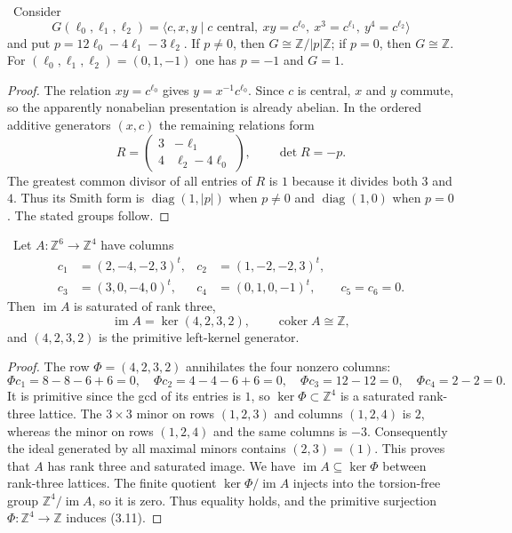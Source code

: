 \begin{proposition}
\label{prop:terminal-group}
\Verified\ Consider
\[
G(\ell_0,\ell_1,\ell_2)=
\langle c,x,y\mid c\text{ central},\
xy=c^{\ell_0},\ x^3=c^{\ell_1},\ y^4=c^{\ell_2}\rangle
\]
and put $p=12\ell_0-4\ell_1-3\ell_2$.  If $p\ne0$, then
$G\cong\mathbb Z/|p|\mathbb Z$; if $p=0$, then $G\cong\mathbb Z$.
For $(\ell_0,\ell_1,\ell_2)=(0,1,-1)$ one has $p=-1$ and $G=1$.
\end{proposition}

\begin{proof}
The relation $xy=c^{\ell_0}$ gives $y=x^{-1}c^{\ell_0}$.  Since $c$ is
central, $x$ and $y$ commute, so the apparently nonabelian presentation is
already abelian.  In the ordered additive generators $(x,c)$ the remaining
relations form
\[
R=\begin{pmatrix}3&-\ell_1\\4&\ell_2-4\ell_0\end{pmatrix},
\qquad \det R=-p.
\]
The greatest common divisor of all entries of $R$ is $1$ because it divides
both $3$ and $4$.  Thus its Smith form is
$\operatorname{diag}(1,|p|)$ when $p\ne0$ and
$\operatorname{diag}(1,0)$ when $p=0$.  The stated groups follow.
\end{proof}

\begin{proposition}
\label{prop:terminal-degree-two}
\Verified\ Let $A:\mathbb Z^6\to\mathbb Z^4$ have columns
\[
\begin{aligned}
c_1&=(2,-4,-2,3)^t,&c_2&=(1,-2,-2,3)^t,\\
c_3&=(3,0,-4,0)^t,&c_4&=(0,1,0,-1)^t,
\qquad c_5=c_6=0.
\end{aligned}
\]
Then $\operatorname{im}A$ is saturated of rank three,
\[
\operatorname{im}A=\ker(4,2,3,2),
\qquad
\operatorname{coker}A\cong\mathbb Z,
\tag{3.11}
\]
and $(4,2,3,2)$ is the primitive left-kernel generator.
\end{proposition}

\begin{proof}
The row $\Phi=(4,2,3,2)$ annihilates the four nonzero columns:
\[
\Phi c_1=8-8-6+6=0,\quad
\Phi c_2=4-4-6+6=0,\quad
\Phi c_3=12-12=0,\quad
\Phi c_4=2-2=0.
\]
It is primitive since the gcd of its entries is $1$, so
$\ker\Phi\subset\mathbb Z^4$ is a saturated rank-three lattice.
The $3\times3$ minor on rows $(1,2,3)$ and columns $(1,2,4)$ is $2$,
whereas the minor on rows $(1,2,4)$ and the same columns is $-3$.
Consequently the ideal generated by all maximal minors contains $(2,3)=(1)$.
This proves that $A$ has rank three and saturated image.  We have
$\operatorname{im}A\subseteq\ker\Phi$ between rank-three lattices.
The finite quotient $\ker\Phi/\operatorname{im}A$ injects into the
torsion-free group $\mathbb Z^4/\operatorname{im}A$, so it is zero.
Thus equality holds, and the primitive surjection $\Phi:\mathbb Z^4\to
\mathbb Z$ induces (3.11).
\end{proof}


